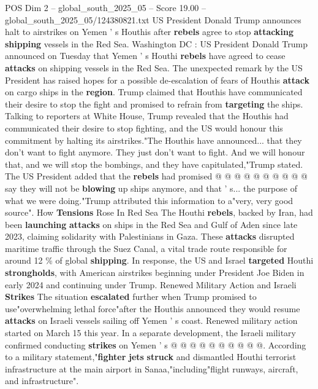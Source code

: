 \begin{textsample}{POS Dim 2 – global\_south\_2025\_05 – Score 19.00 – global\_south\_2025\_05/124380821.txt}  \label{ex:f2_pos_294}
US President Donald Trump announces halt to airstrikes on Yemen ' s Houthis after \textbf{rebels} agree to stop \textbf{attacking} \textbf{shipping} vessels in the Red Sea.
Washington DC : US President Donald Trump announced on Tuesday that Yemen ' s Houthi \textbf{rebels} have agreed to cease \textbf{attacks} on shipping vessels in the Red Sea.
The unexpected remark by the US President has raised hopes for a possible de-escalation of fears of Houthis \textbf{attack} on cargo ships in the \textbf{region}.
Trump claimed that Houthis have communicated their desire to stop the fight and promised to refrain from \textbf{targeting} the ships.
Talking to reporters at White House, Trump revealed that the Houthis had communicated their desire to stop fighting, and the US would honour this commitment by halting its airstrikes."The Houthis have announced... that they don't want to fight anymore.
They just don't want to fight.
And we will honour that, and we will stop the bombings, and they have capitulated,"Trump stated.
The US President added that the \textbf{rebels} had promised @ @ @ @ @ @ @ @ @ @ say they will not be \textbf{blowing} up ships anymore, and that ' s... the purpose of what we were doing."Trump attributed this information to a"very, very good source".
How \textbf{Tensions} Rose In Red Sea The Houthi \textbf{rebels}, backed by Iran, had been \textbf{launching} \textbf{attacks} on ships in the Red Sea and Gulf of Aden since late 2023, claiming solidarity with Palestinians in Gaza.
These \textbf{attacks} disrupted maritime traffic through the Suez Canal, a vital trade route responsible for around 12 \% of global \textbf{shipping}.
In response, the US and Israel \textbf{targeted} Houthi \textbf{strongholds}, with American airstrikes beginning under President Joe Biden in early 2024 and continuing under Trump.
Renewed Military Action and Israeli \textbf{Strikes} The situation \textbf{escalated} further when Trump promised to use"overwhelming lethal force"after the Houthis announced they would resume \textbf{attacks} on Israeli vessels sailing off Yemen ' s coast.
Renewed military action started on March 15 this year.
In a separate development, the Israeli military confirmed conducting \textbf{strikes} on Yemen ' s @ @ @ @ @ @ @ @ @ @.
According to a military statement,"\textbf{fighter} \textbf{jets} \textbf{struck} and dismantled Houthi terrorist infrastructure at the main airport in Sanaa,"including"flight runways, aircraft, and infrastructure".

\end{textsample}
